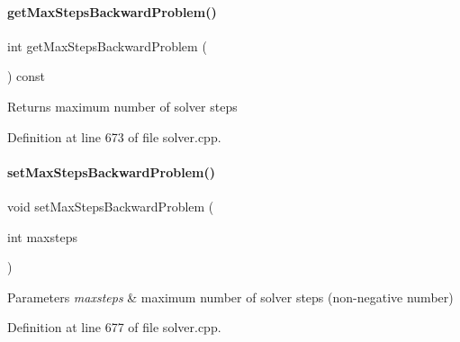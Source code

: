 \paragraph{\texorpdfstring{get\+Max\+Steps\+Backward\+Problem()}{getMaxStepsBackwardProblem()}}
{\footnotesize\ttfamily int get\+Max\+Steps\+Backward\+Problem (\begin{DoxyParamCaption}{ }\end{DoxyParamCaption}) const}

\begin{DoxyReturn}{Returns}
maximum number of solver steps 
\end{DoxyReturn}


Definition at line 673 of file solver.\+cpp.

\mbox{\label{classamici_1_1_solver_aa1d39cd744f489c17c3497c98acb7f59}} 
\paragraph{\texorpdfstring{set\+Max\+Steps\+Backward\+Problem()}{setMaxStepsBackwardProblem()}}
{\footnotesize\ttfamily void set\+Max\+Steps\+Backward\+Problem (\begin{DoxyParamCaption}\item[{int}]{maxsteps }\end{DoxyParamCaption})}


\begin{DoxyParams}{Parameters}
{\em maxsteps} & maximum number of solver steps (non-\/negative number) \\
\hline
\end{DoxyParams}


Definition at line 677 of file solver.\+cpp.

